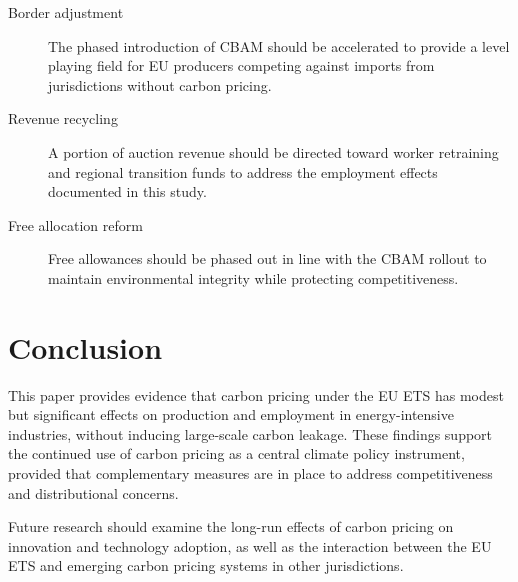 \documentclass[
    language=english,
    doctype=article,
    institution=none,
    titlestyle=book,
]{../../omnilatex}
\begin{document}
\begin{description}
    \item[Border adjustment] The phased introduction of CBAM should be
    accelerated to provide a level playing field for EU producers competing
    against imports from jurisdictions without carbon pricing.
    \item[Revenue recycling] A portion of auction revenue should be directed
    toward worker retraining and regional transition funds to address the
    employment effects documented in this study.
    \item[Free allocation reform] Free allowances should be phased out in line
    with the CBAM rollout to maintain environmental integrity while protecting
    competitiveness.
\end{description}

\section{Conclusion}
This paper provides evidence that carbon pricing under the EU ETS has modest
but significant effects on production and employment in energy-intensive
industries, without inducing large-scale carbon leakage.  These findings
support the continued use of carbon pricing as a central climate policy
instrument, provided that complementary measures are in place to address
competitiveness and distributional concerns.

Future research should examine the long-run effects of carbon pricing on
innovation and technology adoption, as well as the interaction between the EU
ETS and emerging carbon pricing systems in other jurisdictions.

\printbibliography
\end{document}
